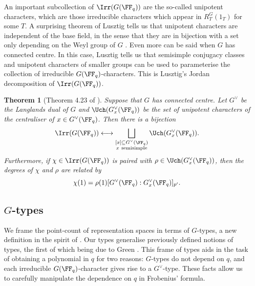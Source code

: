 \documentclass{amsart}
\theoremstyle{plain}
\newtheorem{thm}{Theorem}
\theoremstyle{definition}
\theoremstyle{remark}
\begin{document}
An important subcollection of $\Irr(G(\FF_q))$ are the so-called unipotent characters, which are those irreducible characters which appear in $R_T^G(1_T)$ for some $T$. A surprising theorem of Lusztig tells us that unipotent characters are independent of the base field, in the sense that they are in bijection with a set only depending on the Weyl group of $G$ \cite[Theorem 2.4.1]{GM20}. Even more can be said when $G$ has connected centre. In this case, Lusztig tells us that semisimple conjugacy classes and unipotent characters of smaller groups can be used to parameterise the collection of irreducible $G(\FF_q)$-characters. This is Lusztig's Jordan decomposition of $\Irr(G(\FF_q))$.
\begin{thm}[Theorem 4.23 of \cite{Lusztig84}]\label{ThmLusztigJordan}
Suppose that $G$ has connected centre. Let $G^\vee$ be the Langlands dual of $G$ and $\Uch(G^\vee_x(\FF_q))$ be the set of unipotent characters of the centraliser of $x\in G^\vee(\FF_q)$. Then there is a bijection
\[
\Irr(G(\FF_q)) \longleftrightarrow \bigsqcup_{\substack{[x]\subseteq G^{\vee}(\FF_q) \\ x\ \text{semisimple}}} \Uch(G^\vee_x(\FF_q)).
\]
Furthermore, if $\chi\in\Irr(G(\FF_q))$ is paired with $\rho\in\Uch(G_x^\vee(\FF_q))$, then the degrees of $\chi$ and $\rho$ are related by 
\[
\chi(1) = \rho(1)[G^\vee(\FF_q):G^\vee_x(\FF_q)]_{p'}.
\]
\end{thm}
\subsection*{$G$-types}
We frame the point-count of representation spaces in terms of $G$-types, a new definition in the spirit of \cite{HRV08,HLRV11,Mereb15,Cambo17}. Our types generalise previously defined notions of types, the first of which being due to Green \cite{Green55}. This frame of types aids in the task of obtaining a polynomial in $q$ for two reasons: $G$-types do not depend on $q$, and each irreducible $G(\FF_q)$-character gives rise to a $G^\vee$-type. These facts allow us to carefully manipulate the dependence on $q$ in Frobenius' formula. 
\end{document}
